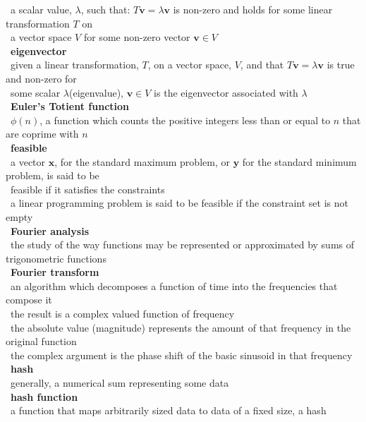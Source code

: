 \documentclass[10pt,letterpaper]{scrartcl}
\newcommand{\tbul}{\textbullet}
\newcommand{\tend}{\>\textendash}
\newcommand{\tasc}{\>\>\textasteriskcentered}
\begin{document}
\begin{tabbing}
    \tend\ a scalar value, $\lambda$, such that: $T\mathbf{v}=\lambda\mathbf{v}$ is non-zero and holds for some linear transformation $T$ on \\ \>\ a vector space $V$ for some non-zero vector $\mathbf{v} \in V$\\
\tbul\ \textbf{eigenvector} \\
    \tend\ given a linear transformation, $T$, on a vector space, $V$, and that $T\mathbf{v}=\lambda\mathbf{v}$ is true and non-zero for \\ \>\ some scalar $\lambda$(eigenvalue), $\mathbf{v} \in V$ is the eigenvector associated with $\lambda$ \\
\tbul\ \textbf{Euler's Totient function} \\
    \tend\ $\phi (n)$, a function which counts the positive integers less than or equal to $n$ that are coprime with $n$\\
\tbul\ \textbf{feasible} \\
    \tend\ a vector $\mathbf{x}$, for the standard maximum problem, or $\mathbf{y}$ for the standard minimum problem, is said to be \\ \>\ feasible if it satisfies the constraints \\
    \tend\ a linear programming problem is said to be feasible if the constraint set is not empty \\
\tbul\ \textbf{Fourier analysis} \\
    \tend\ the study of the way functions may be represented or approximated by sums of trigonometric functions \\
\tbul\ \textbf{Fourier transform} \\
    \tend\ an algorithm which decomposes a function of time into the frequencies that compose it \\
    \tend\ the result is a complex valued function of frequency \\
        \tasc\ the absolute value (magnitude) represents the amount of that frequency in the original function \\
        \tasc\ the complex argument is the phase shift of the basic sinusoid in that frequency \\
\tbul\ \textbf{hash} \\
    \tend\ generally, a numerical sum representing some data \\
\tbul\ \textbf{hash function} \\
    \tend\ a function that maps arbitrarily sized data to data of a fixed size, a hash \\

\end{tabbing}
\end{document}
